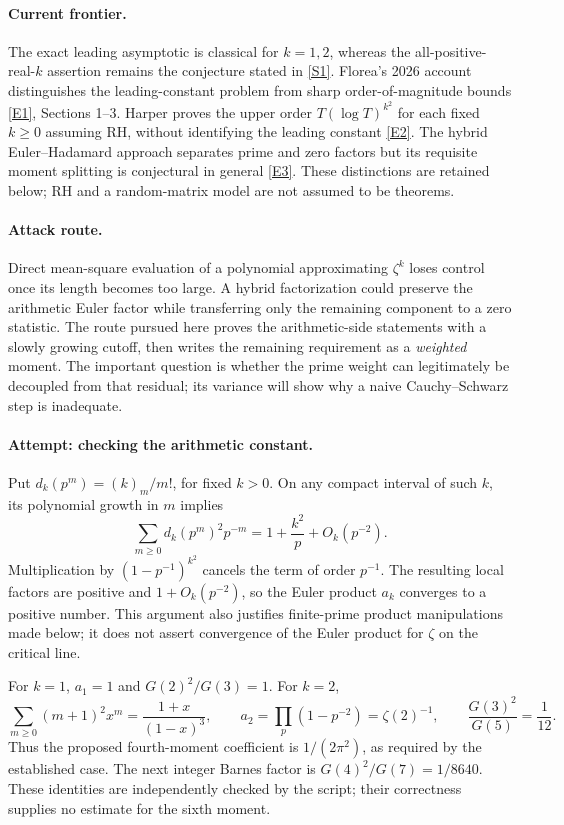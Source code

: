 \documentclass[11pt,a4paper]{article}
\newcommand{\sref}[2]{\hyperlink{source:#1:#2}{[S#2]}}
\newcommand{\eref}[2]{\hyperlink{extra:#1:#2}{[E#2]}}
\numberwithin{equation}{section}
\begin{document}
\paragraph{Current frontier.}
The exact leading asymptotic is classical for $k=1,2$, whereas the
all-positive-real-$k$ assertion remains the conjecture stated in
\sref{30006978}{1}. Florea's 2026 account distinguishes the leading-constant
problem from sharp order-of-magnitude bounds \eref{30006978}{1}, Sections
1--3. Harper proves the upper order $T(\log T)^{k^2}$ for each fixed
$k\ge0$ assuming RH, without identifying the leading constant
\eref{30006978}{2}. The hybrid Euler--Hadamard approach separates prime and
zero factors but its requisite moment splitting is conjectural in general
\eref{30006978}{3}. These distinctions are retained below; RH and a
random-matrix model are not assumed to be theorems.

\paragraph{Attack route.}
Direct mean-square evaluation of a polynomial approximating $\zeta^k$
loses control once its length becomes too large. A hybrid factorization
could preserve the arithmetic Euler factor while transferring only the
remaining component to a zero statistic. The route pursued here proves
the arithmetic-side statements with a slowly growing cutoff, then writes
the remaining requirement as a \emph{weighted} moment. The important
question is whether the prime weight can legitimately be decoupled from
that residual; its variance will show why a naive Cauchy--Schwarz step
is inadequate.

\paragraph{Attempt: checking the arithmetic constant.}
Put $d_k(p^m)=(k)_m/m!$, for fixed $k>0$. On any compact interval of
such $k$, its polynomial growth in $m$ implies
\[
 \sum_{m\ge0}d_k(p^m)^2p^{-m}=1+\frac{k^2}{p}+O_k(p^{-2}).
\]
Multiplication by $(1-p^{-1})^{k^2}$ cancels the term of order $p^{-1}$.
The resulting local factors are positive and $1+O_k(p^{-2})$, so the
Euler product $a_k$ converges to a positive number. This argument also
justifies finite-prime product manipulations made below; it does not
assert convergence of the Euler product for $\zeta$ on the critical line.

For $k=1$, $a_1=1$ and $G(2)^2/G(3)=1$. For $k=2$,
\[
 \sum_{m\ge0}(m+1)^2x^m=\frac{1+x}{(1-x)^3},\qquad
 a_2=\prod_p(1-p^{-2})=\zeta(2)^{-1},
 \qquad\frac{G(3)^2}{G(5)}=\frac1{12}.
\]
Thus the proposed fourth-moment coefficient is $1/(2\pi^2)$, as required
by the established case. The next integer Barnes factor is
$G(4)^2/G(7)=1/8640$. These identities are independently checked by the
script; their correctness supplies no estimate for the sixth moment.
\end{document}
